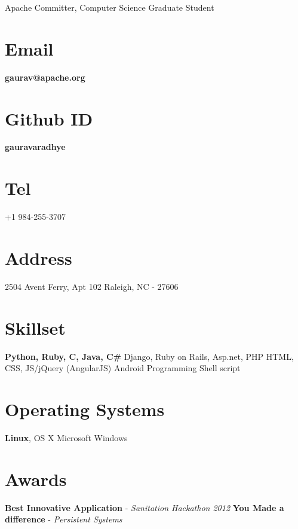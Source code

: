 \documentclass[]{friggeri-cv}
\begin{document}
      {Apache Committer, Computer Science Graduate Student}
      
\noindent\hspace{-0.16\textwidth}\makebox[\linewidth]{\rule{19.5cm}{0.4pt}}

\begin{aside}
\vspace{30 mm} \leavevmode
  \section{Email}
    \textbf{gaurav@apache.org}
    ~
  \section{Github ID}
    \textbf{gauravaradhye}
    ~
  \section{Tel}
    +1 984-255-3707
    ~
  \section{Address}
    2504 Avent Ferry, Apt 102
    Raleigh, NC - 27606
    ~
  \section{Skillset}
        \textbf{Python, Ruby, C, Java, C\#}
        Django, Ruby on Rails, \leavevmode
        Asp.net, PHP
        HTML, CSS, JS/jQuery (AngularJS)
        Android Programming
        Shell script
~
  \section{Operating Systems}
        \textbf{Linux}, OS X\leavevmode
        Microsoft Windows
~
  \section{Awards}
        \textbf{Best Innovative Application} -
        \emph{Sanitation Hackathon 2012}
        \vspace{1mm} \leavevmode
        \textbf{You Made a difference} -
        \emph{Persistent Systems}
~
\end{aside}
\end{document}
